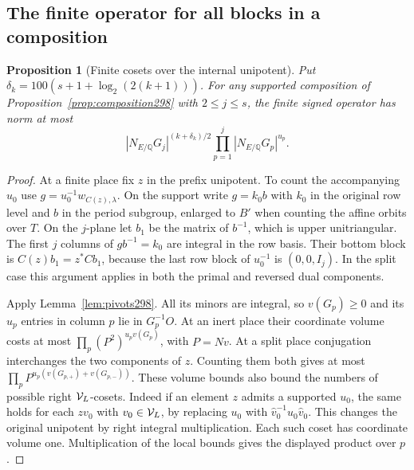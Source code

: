 \documentclass[a4paper,11pt]{article}
\newtheorem{proposition}{Proposition}[section]
\theoremstyle{definition}
\theoremstyle{remark}
\numberwithin{equation}{section}
\begin{document}
\subsection{The finite operator for all blocks in a composition}\label{nav:II-68}
\begin{proposition}[Finite cosets over the internal unipotent]\leavevmode
\label{prop:compositionfinite298}
Put \(\delta_k=100(s+1+\log_2(2(k+1)))\). For any
supported composition of Proposition~\ref{prop:composition298}
with \(2\le j\le s\), the finite signed operator has norm at most
\[
     |N_{E/\mathbb Q}G_j|^{(k+\delta_k)/2}
                          \prod_{p=1}^j |N_{E/\mathbb Q}G_p|^{u_p}.
\]
\end{proposition}
\begin{proof}
At a finite place fix \(z\) in the prefix unipotent. To count
the accompanying \(u_0\) use \(g=u_0^{-1}w_{C(z),\lambda}\).
On the support write \(g=k_0 b\) with \(k_0\) in the original
row level and \(b\) in the period subgroup, enlarged to \(B'\)
when counting the affine orbits over \(T\). On the \(j\)-plane
let \(b_1\) be the matrix of \(b^{-1}\), which is upper
unitriangular. The first \(j\) columns of \(gb^{-1}=k_0\)
are integral in the row basis. Their bottom block is
\(C(z)b_1=z^*C b_1\), because the last row block of \(u_0^{-1}\)
is \((0,0,I_j)\). In the split case this argument applies
in both the primal and reversed dual components.

Apply Lemma~\ref{lem:pivots298}. All its minors are integral,
so \(v(G_p)\ge0\) and its \(u_p\) entries in column \(p\)
lie in \(G_p^{-1}O\). At an inert place their coordinate
volume costs at most \(\prod_p(P^2)^{u_p v(G_p)}\), with
\(P=Nv\). At a split place conjugation interchanges the
two components of \(z\). Counting them both gives at most
\(\prod_p P^{u_p(v(G_{p,+})+v(G_{p,-}))}\).
These volume bounds also bound the numbers of possible
right \({\cal V}_L\)-cosets. Indeed if an element \(z\)
admits a supported \(u_0\), the same holds for each \(zv_0\)
with \(v_0\in{\cal V}_L\), by replacing \(u_0\) with
\(\widehat v_0^{-1}u_0\widehat v_0\). This changes the
original unipotent by right integral multiplication.
Each such coset has coordinate volume one. Multiplication
of the local bounds gives the displayed product over \(p\).


\end{proof}
\end{document}

